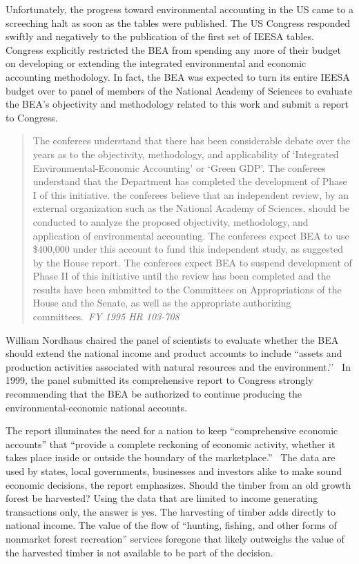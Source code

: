 Unfortunately, the progress toward environmental accounting in the US came to a screeching halt as soon as the tables were published. The US Congress responded swiftly and negatively to the publication of the first set of IEESA tables. Congress explicitly restricted the BEA from spending any more of their budget on developing or extending the integrated environmental and economic accounting methodology. In fact, the BEA was expected to turn its entire IEESA budget over to panel of members of the National Academy of Sciences to evaluate the BEA’s objectivity and methodology related to this work and submit a report to Congress.

\begin{quote}
The conferees understand that there has been considerable debate over the years as to the objectivity, methodology, and applicability of `Integrated Environmental-Economic Accounting' or `Green GDP'. The conferees understand that the Department has completed the development of Phase I of this initiative. the conferees believe that an independent review, by an external organization such as the National Academy of Sciences, should be conducted to analyze the proposed objectivity, methodology, and application of environmental accounting. The conferees expect BEA to use \$400,000 under this account to fund this independent study, as suggested by the House report. The conferees expect BEA to suspend development of Phase II of this initiative until the review has been completed and the results have been submitted to the Committees on Appropriations of the House and the Senate, as well as the appropriate authorizing committees.~\emph{FY 1995 HR 103-708}
\end{quote}

William Nordhaus chaired the panel of scientists to evaluate whether the BEA should extend the national income and product accounts to include ``assets and production activities associated with natural resources and the environment.’’~\cite[p. 2]{ Nordhaus1999a} In 1999, the panel submitted its comprehensive report to Congress strongly recommending that the BEA be authorized to continue producing the environmental-economic national accounts.~\cite{ Nordhaus1999a}

The report illuminates the need for a nation to keep ``comprehensive economic accounts'' that ``provide a complete reckoning of
 economic activity, whether it takes place inside or outside the boundary of the marketplace.''~\cite[p. 29]{ Nordhaus1999a}
 The data are used by states, local governments, businesses and investors alike to make sound economic decisions, the report emphasizes. 
Should the timber from an old growth forest be harvested?
 Using the data that are limited to income generating transactions only, the answer is yes. The harvesting of timber adds directly to national income. The value of the flow of ``hunting, fishing, and other forms of nonmarket forest recreation'' 
services foregone that likely outweighs the value of the harvested timber is not available to be part of the decision.~\cite[p. 30]{ Nordhaus1999a}


